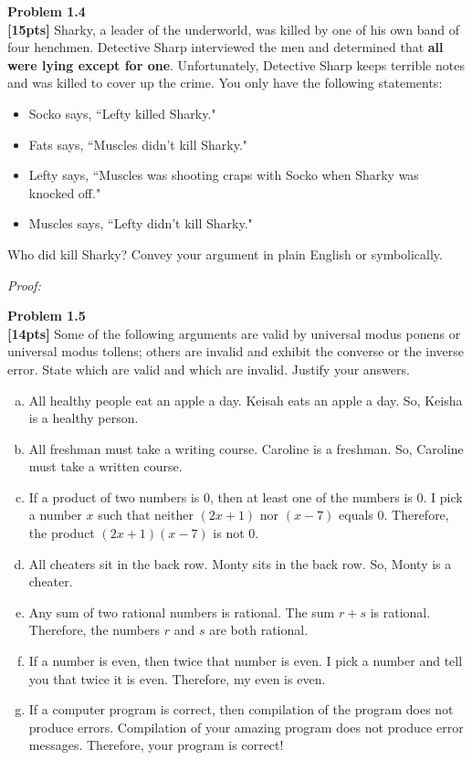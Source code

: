 \documentclass{article}
\newenvironment{problem}[2][Problem]
    { \begin{mdframed}[backgroundcolor=gray!20] \textbf{#1 #2} \\}
    {  \end{mdframed}}
\newenvironment{solution}
    {\textit{Proof:}}
    {}
\begin{document}
\begin{problem}{1.4}
\textbf{[15pts]} Sharky, a leader of the underworld, was killed by one of his own band of four henchmen. Detective Sharp interviewed the men and determined that \textbf{all were lying except for one}. Unfortunately, Detective Sharp keeps terrible notes and was killed to cover up the crime. You only have the following statements:
\begin{itemize}
    \item Socko says, ``Lefty killed Sharky."
    \item Fats says, ``Muscles didn't kill Sharky."
    \item Lefty says, ``Muscles was shooting craps with Socko when Sharky was knocked off."
    \item Muscles says, ``Lefty didn't kill Sharky."
\end{itemize}
Who did kill Sharky? Convey your argument in plain English or symbolically. 
\end{problem}

\begin{solution}
\end{solution}
\newpage %

\begin{problem}{1.5}
\textbf{[14pts]} Some of the following arguments are valid by universal modus ponens or universal modus tollens; others are invalid and exhibit the converse or the inverse error. State which are valid and which are invalid. Justify your answers.
\begin{enumerate}[a)]
\item All healthy people eat an apple a day. Keisah eats an apple a day. So, Keisha is a healthy person.
\item All freshman must take a writing course. Caroline is a freshman. So, Caroline must take a written course. 
\item If a product of two numbers is 0, then at least one of the numbers is 0. I pick a number $x$ such that neither $(2x+1)$ nor $(x-7)$ equals 0. Therefore, the product $(2x+1)(x-7)$ is not 0.
\item All cheaters sit in the back row. Monty sits in the back row. So, Monty is a cheater. 
\item Any sum of two rational numbers is rational. The sum $r+s$ is rational. Therefore, the numbers $r$ and $s$ are both rational. 
\item If a number is even, then twice that number is even. I pick a number and tell you that twice it is even. Therefore, my even is even. 
\item If a computer program is correct, then compilation of the program does not produce errors. Compilation of your amazing program does not produce error messages. Therefore, your program is correct!
\end{enumerate}
\end{problem}
\end{document}
